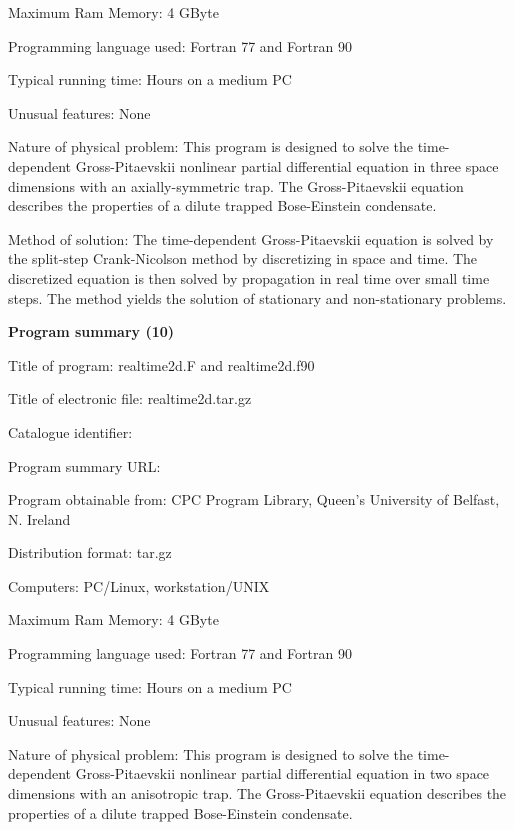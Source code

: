 \documentclass[onecolumn]{elsart3p}
\begin{document}
Maximum Ram Memory: 4 GByte

Programming language used: Fortran 77 and Fortran 90




Typical running time: Hours on a medium PC

Unusual features: None

Nature of physical problem: This program is designed to solve the
time-dependent Gross-Pitaevskii nonlinear partial differential equation
in three space dimensions with an axially-symmetric trap. The
Gross-Pitaevskii equation describes the properties of a dilute trapped
Bose-Einstein condensate.


Method of solution: The time-dependent Gross-Pitaevskii equation is 
solved by the split-step Crank-Nicolson method by discretizing in space 
and time. The discretized equation is then solved by propagation in 
real time over small time steps.  The method yields the solution of 
stationary and non-stationary problems.  


{\bf Program summary (10)}

Title of program: realtime2d.F and realtime2d.f90

Title of electronic file: realtime2d.tar.gz


Catalogue identifier:

Program summary URL: 

Program obtainable from: CPC Program Library, Queen's University of 
Belfast, N. Ireland

Distribution format: tar.gz

Computers: PC/Linux, workstation/UNIX

Maximum Ram Memory: 4 GByte

Programming language used: Fortran 77 and Fortran 90




Typical running time: Hours on a medium PC

Unusual features: None

Nature of physical problem: This program is designed to solve the
time-dependent Gross-Pitaevskii nonlinear partial differential equation
in two space dimensions with an anisotropic trap. The Gross-Pitaevskii
equation describes the properties of a dilute trapped Bose-Einstein
condensate.
\end{document}
